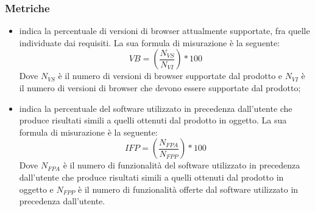 \documentclass[PianoDiQualifica.tex]{subfiles}
\begin{document}
\subsubsection{Metriche}
\begin{itemize}
	\item {} indica la percentuale di versioni di browser attualmente supportate, fra quelle individuate dai requisiti. La sua formula di misurazione è la seguente: \[VB=(\frac{N_{VS}}{N_{VI}})*100\] Dove $ N_{VS} $ è il numero di versioni di browser supportate dal prodotto e $ N_{VI} $ è il numero di versioni di browser che devono essere supportate dal prodotto;
	\item {} indica la percentuale del software utilizzato in precedenza dall'utente che produce risultati simili a quelli ottenuti dal prodotto in oggetto. La sua formula di misurazione è la seguente: \[IFP=(\frac{N_{FPA}}{N_{FPP}})*100\] Dove $ N_{FPA} $ è il numero di funzionalità del software utilizzato in precedenza dall'utente che produce risultati simili a quelli ottenuti dal prodotto in oggetto e $ N_{FPP} $ è il numero di funzionalità offerte dal software utilizzato in precedenza dall'utente. 
\end{itemize}
\newpage
\end{document}
